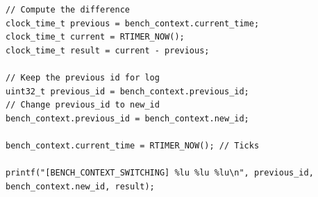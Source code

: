 \begin{lstlisting}[style=CStyle, float, label={lst:measurement-code}, caption={Source code of the benchmarking framework implemented in Contiki}]
// Compute the difference
clock_time_t previous = bench_context.current_time;
clock_time_t current = RTIMER_NOW();
clock_time_t result = current - previous;

// Keep the previous id for log
uint32_t previous_id = bench_context.previous_id;
// Change previous_id to new_id
bench_context.previous_id = bench_context.new_id;

bench_context.current_time = RTIMER_NOW(); // Ticks

printf("[BENCH_CONTEXT_SWITCHING] %lu %lu %lu\n", previous_id, bench_context.new_id, result);
\end{lstlisting}






